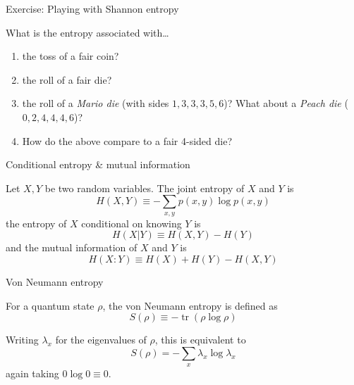 \documentclass[10pt,aspectratio=169]{beamer}
\newcommand{\tr}{\operatorname{tr}}
\begin{document}
\begin{frame}{Exercise: Playing with Shannon entropy}
  \begin{exampleblock}{What is the entropy associated with\dots}
    \begin{enumerate}[<+->]
      \item the toss of a fair coin?
      \item the roll of a fair die?
      \item the roll of a \emph{Mario die} (with sides $1,3,3,3,5,6$)? What
        about a \emph{Peach die} ($0,2,4,4,4,6$)?
      \item How do the above compare to a fair 4-sided die?
    \end{enumerate}
  \end{exampleblock}
\end{frame}

\begin{frame}{Conditional entropy \& mutual information}
  \begin{definition}
    Let $X,Y$ be two random variables. The joint entropy of $X$ and $Y$ is
    \[H(X,Y) \equiv -\sum_{x,y}p(x,y)\log p(x,y)\]
    \pause
    the entropy of $X$ conditional on knowing $Y$ is
    \[H(X|Y)\equiv H(X,Y) - H(Y)\]
    \pause
    and the mutual information of $X$ and $Y$ is
    \[H(X:Y)\equiv H(X) + H(Y) - H(X,Y)\]
  \end{definition}
\end{frame}

\begin{frame}{Von Neumann entropy}
  \begin{definition}
    For a quantum state $\rho$, the von Neumann entropy is defined as
    \[S(\rho) \equiv -\tr(\rho\log\rho)\]
  \end{definition}
  {\small Writing $\lambda_x$ for the eigenvalues of $\rho$, this is equivalent
  to
  \[S(\rho)=-\sum_x \lambda_x\log\lambda_x\]
  again taking $0\log 0 \equiv 0$.\par}
\end{frame}
\end{document}
